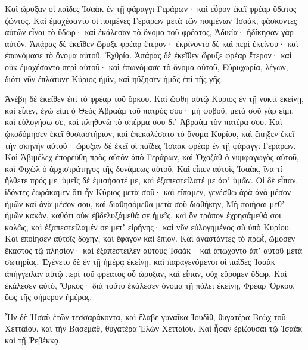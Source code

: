 {Καὶ ὤρυξαν οἱ παῖδες Ἰσαὰκ ἐν τῇ φάραγγι Γεράρων· καὶ εὗρον ἐκεῖ φρέαρ ὕδατος ζῶντος.
Καὶ ἐμαχέσαντο οἱ ποιμένες Γεράρων μετὰ τῶν ποιμένων Ἰσαὰκ, φάσκοντες αὐτῶν εἶναι τὸ ὕδωρ· καὶ ἐκάλεσαν τὸ ὄνομα τοῦ φρέατος, Ἀδικία· ἠδίκησαν γὰρ αὐτόν.
Ἀπᾴρας δὲ ἐκεῖθεν ὤρυξε φρέαρ ἕτερον· ἐκρίνοντο δὲ καὶ περὶ ἐκείνου· καὶ ἐπωνόμασε τὸ ὄνομα αὐτοῦ, Ἐχθρία.
Ἀπᾴρας δὲ ἐκεῖθεν ὤρυξε φρέαρ ἕτερον· καὶ οὐκ ἐμαχέσαντο περὶ αὐτοῦ· καὶ ἐπωνόμασε τὸ ὄνομα αὐτοῦ, Εὐρυχωρία, λέγων, διότι νῦν ἐπλάτυνε Κύριος ἡμῖν, καὶ ηὔξησεν ἡμᾶς ἐπὶ τῆς γῆς.
\par }{\PP {}Ἀνέβη δὲ ἐκεῖθεν ἐπὶ τὸ φρέαρ τοῦ ὅρκου.
Καὶ ὤφθη αὐτῷ Κύριος ἐν τῇ νυκτὶ ἐκείνῃ, καὶ εἶπεν, ἐγώ εἰμι ὁ Θεὸς Ἁβραὰμ τοῦ πατρός σου· μὴ φοβοῦ, μετὰ σοῦ γάρ εἰμι, καὶ εὐλογήσω σε, καὶ πληθυνῶ τὸ σπέρμα σου διʼ Ἁβραὰμ τὸν πατέρα σου.
Καὶ ᾠκοδόμησεν ἐκεῖ θυσιαστήριον, καὶ ἐπεκαλέσατο τὸ ὄνομα Κυρίου, καὶ ἔπηξεν ἐκεῖ τὴν σκηνὴν αὐτοῦ· ὤρυξαν δὲ ἐκεῖ οἱ παῖδες Ἰσαὰκ φρέαρ ἐν τῇ φάραγγι Γεράρων.
Καὶ Ἀβιμέλεχ ἐπορεύθη πρὸς αὐτὸν ἀπὸ Γεράρων, καὶ Ὁχοζὰθ ὁ νυμφαγωγὸς αὐτοῦ, καὶ Φιχὼλ ὁ ἀρχιστράτηγος τῆς δυνάμεως αὐτοῦ.
Καὶ εἶπεν αὐτοῖς Ἰσαὰκ, ἵνα τί ἤλθετε πρός με; ὑμεῖς δὲ ἐμισήσατέ με, καὶ ἐξαπεστείλατέ με ἀφʼ ὑμῶν.
Οἱ δὲ εἶπαν, ἰδόντες ἑωράκαμεν ὅτι ἦν Κύριος μετὰ σοῦ· καὶ εἴπαμεν, γενέσθω ἀρὰ ἀνὰ μέσον ἡμῶν καὶ ἀνὰ μέσον σου, καὶ διαθησόμεθα μετὰ σοῦ διαθήκην,
Μὴ ποιήσαι μεθʼ ἡμῶν κακὸν, καθότι οὐκ ἐβδελυξάμεθά σε ἡμεῖς, καὶ ὃν τρόπον ἐχρησάμεθά σοι καλῶς, καὶ ἐξαπεστείλαμέν σε μετʼ εἰρήνης· καὶ νῦν εὐλογημένος σὺ ὑπὸ Κυρίου.
Καὶ ἐποίησεν αὐτοῖς δοχὴν, καὶ ἔφαγον καὶ ἔπιον.
Καὶ ἀναστάντες τὸ πρωῒ, ὤμοσεν ἕκαστος τῷ πλησίον· καὶ ἐξαπέστειλεν αὐτοὺς Ἰσαάκ· καὶ ἀπῴχοντο ἀπʼ αὐτοῦ μετὰ σωτηρίας.
Ἐγένετο δὲ ἐν τῇ ἡμέρᾳ ἐκείνῃ, καὶ παραγενόμενοι οἱ παῖδες Ἰσαὰκ ἀπήγγειλαν αὐτῷ περὶ τοῦ φρέατος οὗ ὤρυξαν, καὶ εἶπαν, οὐχ εὕρομεν ὕδωρ.
Καὶ ἐκάλεσεν αὐτὸ, Ὅρκος· διὰ τοῦτο ἐκάλεσεν ὄνομα τῇ πόλει ἐκείνῃ, Φρέαρ Ὅρκου, ἕως τῆς σήμερον ἡμέρας.
\par }{\PP {}Ἦν δὲ Ἡσαῦ ἐτῶν τεσσαράκοντα, καὶ ἔλαβε γυναῖκα Ἰουδὶθ, θυγατέρα Βεὼχ τοῦ Χετταίου, καὶ τὴν Βασεμὰθ, θυγατέρα Ἑλὼν Χετταίου.
Καὶ ἦσαν ἐρίζουσαι τῷ Ἰσαὰκ καὶ τῇ Ῥεβέκκᾳ.

}
